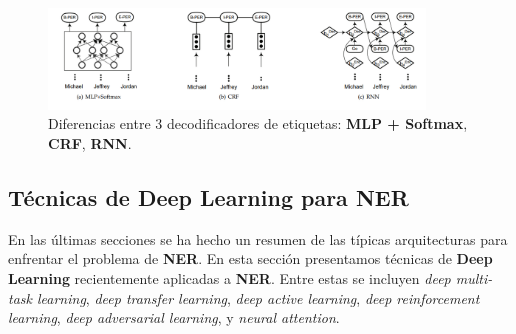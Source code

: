 \begin{figure}[h!]
	\centering
	\includegraphics[width = 10cm]{Imagenes/TagDecoders.png}
	\caption{Diferencias entre 3 decodificadores de etiquetas: \textbf{MLP + Softmax}, \textbf{CRF}, \textbf{RNN}.}\label{fig:tagDec}
\end{figure}


\subsection{T\'ecnicas de Deep Learning para NER}
En las \'ultimas secciones se ha hecho un resumen de las t\'ipicas arquitecturas para enfrentar el problema de \textbf{NER}. En esta secci\'on presentamos t\'ecnicas de \textbf{Deep Learning} recientemente aplicadas a \textbf{NER}. Entre estas se incluyen \emph{deep multi-task learning}, \emph{deep transfer learning}, \emph{deep active learning}, \emph{deep reinforcement learning}, \emph{deep adversarial learning}, y \emph{neural attention}.

